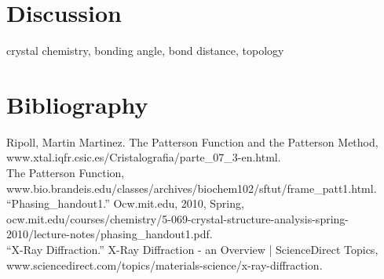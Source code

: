 \documentclass[]{scrartcl}
\begin{document}
\section{Discussion}
crystal chemistry, bonding angle, bond distance, topology

\section{Bibliography}

 Ripoll, Martin Martinez. The Patterson Function and the Patterson Method, www.xtal.iqfr.csic.es/Cristalografia/parte\_07\_3-en.html.
\\
The Patterson Function, www.bio.brandeis.edu/classes/archives/biochem102/sftut/frame\_patt1.html.
\\
“Phasing\_handout1.” Ocw.mit.edu, 2010, Spring, ocw.mit.edu/courses/chemistry/5-069-crystal-structure-analysis-spring-2010/lecture-notes/phasing\_handout1.pdf.
\\
“X-Ray Diffraction.” X-Ray Diffraction - an Overview | ScienceDirect Topics, www.sciencedirect.com/topics/materials-science/x-ray-diffraction.
\end{document}
